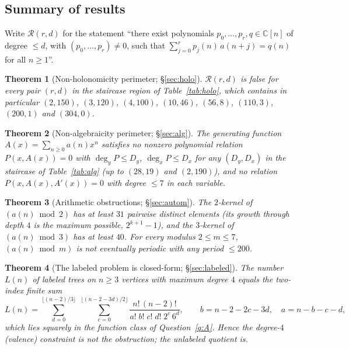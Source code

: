 \documentclass[11pt]{article}
\newtheorem{theorem}{Theorem}[section]
\theoremstyle{definition}
\newcommand{\CC}{\mathbb{C}}
\begin{document}
\subsection{Summary of results}

Write $\mathcal{R}(r,d)$ for the statement ``there exist polynomials
$p_0,\dots,p_r,q\in\CC[n]$ of degree $\le d$, with $(p_0,\dots,p_r)\neq 0$, such
that $\sum_{j=0}^{r}p_j(n)\,a(n+j)=q(n)$ for all $n\ge 1$''.

\begin{theorem}[Non-holonomicity perimeter; \S\ref{sec:holo}]\label{thm:main-holo}
$\mathcal{R}(r,d)$ is \emph{false} for every pair $(r,d)$ in the staircase
region of Table~\ref{tab:holo}, which contains in particular
$(2,150)$, $(3,120)$, $(4,100)$, $(10,46)$, $(56,8)$, $(110,3)$, $(200,1)$ and
$(304,0)$.
\end{theorem}

\begin{theorem}[Non-algebraicity perimeter; \S\ref{sec:alg}]\label{thm:main-alg}
The generating function $A(x)=\sum_{n\ge0}a(n)x^n$ satisfies no nonzero
polynomial relation $P(x,A(x))=0$ with $\deg_y P\le D_y$, $\deg_x P\le D_x$ for
any $(D_y,D_x)$ in the staircase of Table~\ref{tab:alg} (up to $(28,19)$ and
$(2,190)$), and no relation $P(x,A(x),A'(x))=0$ with degree $\le 7$ in each
variable.
\end{theorem}

\begin{theorem}[Arithmetic obstructions; \S\ref{sec:autom}]\label{thm:main-autom}
The $2$-kernel of $(a(n)\bmod 2)$ has at least $31$ pairwise distinct elements
(its growth through depth $4$ is the maximum possible, $2^{k+1}-1$), and the
$3$-kernel of $(a(n)\bmod 3)$ has at least $40$. For every modulus $2\le m\le 7$,
$(a(n)\bmod m)$ is not eventually periodic with any period $\le 200$.
\end{theorem}

\begin{theorem}[The labeled problem is closed-form; \S\ref{sec:labeled}]
\label{thm:main-labeled}
The number $L(n)$ of \emph{labeled} trees on $n\ge3$ vertices with maximum
degree $4$ equals the two-index finite sum
\[
L(n)=\sum_{d=0}^{\lfloor (n-2)/3\rfloor}\;
\sum_{c=0}^{\lfloor (n-2-3d)/2\rfloor}
\frac{n!\,(n-2)!}{a!\;b!\;c!\;d!\;2^{c}\,6^{d}},
\qquad b=n-2-2c-3d,\quad a=n-b-c-d ,
\]
which lies squarely in the function class of Question~\ref{q:A}. Hence the
degree-$4$ (valence) constraint is \emph{not} the obstruction; the unlabeled
quotient is.
\end{theorem}
\end{document}
